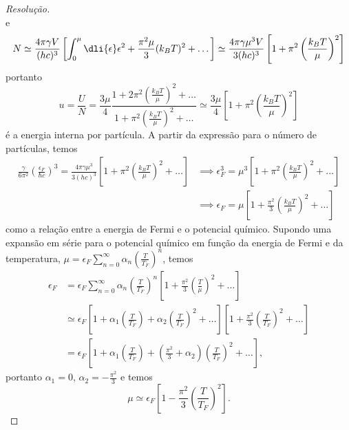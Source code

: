 \begin{proof}[Resolução]
\begin{equation*}
    \end{equation*}
    e
    \begin{equation*}
        N \simeq \frac{4\pi \gamma V}{(hc)^3} \left[\int_0^\mu \dli{\epsilon} \epsilon^2 + \frac{\pi^2\mu}{3} (k_B T)^2 + \dots\right] \simeq \frac{4\pi \gamma \mu^3 V}{3(hc)^3}\left[1 + \pi^2 \left(\frac{k_BT}{\mu}\right)^2\right]
    \end{equation*}
    portanto
    \begin{equation*}
        u = \frac{U}{N} = \frac{3\mu}{4}\frac{1 + 2\pi^2\left(\frac{k_B T}{\mu}\right)^2 + \dots}{1 + \pi^2\left(\frac{k_B T}{\mu}\right)^2 + \dots} \simeq \frac{3\mu}{4} \left[1 + \pi^2 \left(\frac{k_B T}{\mu}\right)^2\right]
    \end{equation*}
    é a energia interna por partícula. A partir da expressão para o número de partículas, temos
    \begin{align*}
        \frac{\gamma}{6\pi^2}\left(\frac{\epsilon_F}{\hbar c}\right)^3 = \frac{4\pi \gamma \mu^3}{3(hc)^3}\left[1 + \pi^2\left(\frac{k_B T}{\mu}\right)^2 + \dots \right]
        &\implies \epsilon_F^3 = \mu^3 \left[1 + \pi^2\left(\frac{k_B T}{\mu}\right)^2 + \dots\right]\\
        &\implies \epsilon_F =  \mu \left[1 + \frac{\pi^2}{3}\left(\frac{k_B T}{\mu}\right)^2 + \dots\right]
    \end{align*}
    como a relação entre a energia de Fermi e o potencial químico. Supondo uma expansão em série para o potencial químico em função da energia de Fermi e da temperatura, \(\mu = \epsilon_F \sum_{n = 0}^\infty \alpha_{n} \left(\frac{T}{T_F}\right)^{n}\), temos
    \begin{align*}
        \epsilon_F &= \epsilon_F\sum_{n = 0}^\infty \alpha_{n} \left(\frac{T}{T_F}\right)^{n}\left[1 + \frac{\pi^2}{3}\left(\frac{T}{\mu}\right)^2 + \dots\right]\\
                   &\simeq \epsilon_F\left[1 + \alpha_1 \left(\frac{T}{T_F}\right) + \alpha_2 \left(\frac{T}{T_F}\right)^2 + \dots\right]\left[1 + \frac{\pi^2}{3}\left(\frac{T}{T_F}\right)^2 + \dots \right]\\
                   &= \epsilon_F\left[1 + \alpha_1\left(\frac{T}{T_F}\right) + \left(\frac{\pi^2}{3} + \alpha_2\right)\left(\frac{T}{T_F}\right)^2 + \dots \right],
    \end{align*}
    portanto \(\alpha_1 = 0\), \(\alpha_2 =-\frac{\pi^2}{3}\) e temos
    \begin{equation*}
        \mu \simeq \epsilon_F\left[1 - \frac{\pi^2}{3}\left(\frac{T}{T_F}\right)^2\right].

\end{equation*}
\end{proof}
